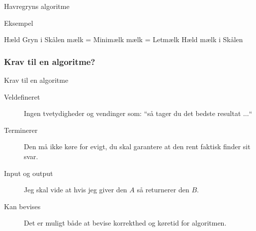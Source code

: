 \documentclass[12pt,t]{beamer}
\begin{document}
    \begin{frame}[plain]{Havregryns algoritme}
        \begin{block}{Eksempel}
        \vspace{-1.5em}
        \begin{algorithm}[H]
            \caption{\newline Indgangsbetingelser: En skål, mælk, havregryn
                     \newline Udgangsbetingelser: Morgenmad
            }
            \begin{algorithmic}
                    \State Hæld Gryn i Skålen
                \EndWhile
                    \State mælk = Minimælk
                \Else
                    \State mælk = Letmælk
                \EndIf
                    \State Hæld mælk i Skålen
                \EndWhile
            \end{algorithmic}
        \end{algorithm}
        \end{block}
    \end{frame}

    \begin{frame}
        \frametitle{Krav til en algoritme?}
        \begin{block}{Krav til en algoritme}
        \begin{description}
            \item[Veldefineret] Ingen tvetydigheder og vendinger som: ``så tager
                du det bedste resultat $\dots$`` \pause
            \item[Terminerer] Den må ikke køre for evigt, du skal garantere
            at den rent faktisk finder sit svar. \pause
            \item[Input og output] Jeg skal vide at hvis jeg giver
            den $A$ så returnerer den $B$. \pause
            \item[Kan bevises] Det er muligt både at bevise korrekthed og
            køretid for algoritmen.
        \end{description}
        \end{block}
    \end{frame}
\end{document}

